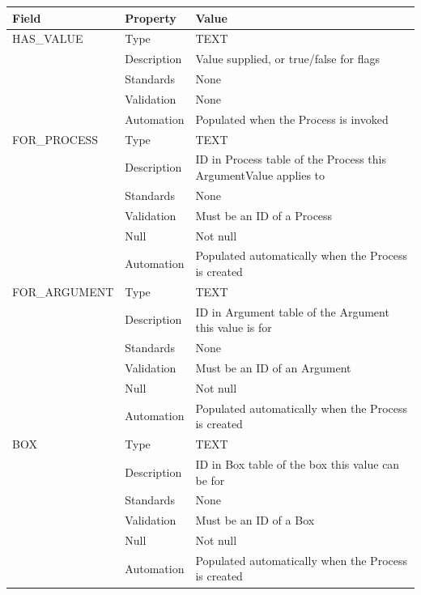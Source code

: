 \begin{longtable}[]{@{}
  >{\raggedright\arraybackslash}p{}
  >{\raggedright\arraybackslash}p{}
  >{\raggedright\arraybackslash}p{}@{}}
\toprule\noalign{}
\begin{minipage}[b]{\linewidth}\raggedright
Field
\end{minipage} & \begin{minipage}[b]{\linewidth}\raggedright
Property
\end{minipage} & \begin{minipage}[b]{\linewidth}\raggedright
Value
\end{minipage} \\
\midrule\noalign{}
\endhead
\bottomrule\noalign{}
\endlastfoot
HAS\_VALUE & Type & TEXT \\
& Description & Value supplied, or true/false for flags \\
& Standards & None \\
& Validation & None \\
& Automation & Populated when the Process is invoked \\
FOR\_PROCESS & Type & TEXT \\
& Description & ID in Process table of the Process this ArgumentValue
applies to \\
& Standards & None \\
& Validation & Must be an ID of a Process \\
& Null & Not null \\
& Automation & Populated automatically when the Process is created \\
FOR\_ARGUMENT & Type & TEXT \\
& Description & ID in Argument table of the Argument this value is
for \\
& Standards & None \\
& Validation & Must be an ID of an Argument \\
& Null & Not null \\
& Automation & Populated automatically when the Process is created \\
BOX & Type & TEXT \\
& Description & ID in Box table of the box this value can be for \\
& Standards & None \\
& Validation & Must be an ID of a Box \\
& Null & Not null \\
& Automation & Populated automatically when the Process is created \\
\end{longtable}

